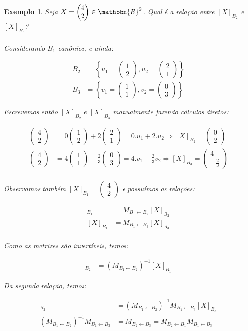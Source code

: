 \documentclass{article}
\newcommand{\REAL} {\mathbbm{R}}
\newcommand{\mudabase}[3] {#1_{#2 \leftarrow #3}}
\newcommand{\vetor}[2] {\begin{pmatrix}#1\\#2\end{pmatrix}} %
\newtheorem{example}{Exemplo}[section]
\begin{document}
        \begin{example}
            Seja $X = \vetor{4}{2} \in \REAL^2$. Qual é a relação entre $[X]_{B_2}$ e $[X]_{B_3}$?

            \paragraph{}
            Considerando $B_1$ canônica, e ainda:

            \begin{align*}
                B_2 &= \left\{ u_1 = \vetor{1}{2}, u_2 = \vetor{2}{1} \right\}\\
                B_3 &= \left\{ v_1 = \vetor{1}{1}, v_2 = \vetor{0}{3} \right\}
            \end{align*}

            Escrevemos então $[X]_{B_2}$ e $[X]_{B_3}$ manualmente fazendo cálculos diretos:

            \begin{align*}
                \vetor{4}{2} &= 0 \vetor{1}{2} + 2 \vetor{2}{1} = 0.u_1 + 2.u_2 \Rightarrow [X]_{B_2} = \vetor{0}{2}\\
                \vetor{4}{2} &= 4 \vetor{1}{1} - \frac{2}{3} \vetor{0}{3} = 4.v_1 - \frac{2}{3}v_2 \Rightarrow [X]_{B_3} = \vetor{4}{-\frac{2}{3}}\\
            \end{align*}

            Observamos também $[X]_{B_1} = \vetor{4}{2}$ e possuímos as relações:

            \begin{align*}
                [X]_{B_1} &= \mudabase{M}{B_1}{B_2} [X]_{B_2}\\
                [X]_{B_1} &= \mudabase{M}{B_1}{B_3} [X]_{B_3}\\
            \end{align*}

            Como as matrizes são invertíveis, temos:

            \begin{align*}
                [X]_{B_2} &= (\mudabase{M}{B_1}{B_2})^{-1} [X]_{B_1}
            \end{align*}

            Da segunda relação, temos:

            \begin{align*}
                [X]_{B_2} &= (\mudabase{M}{B_1}{B_2})^{-1} \mudabase{M}{B_1}{B_3} [X]_{B_3}\\
                (\mudabase{M}{B_1}{B_2})^{-1} \mudabase{M}{B_1}{B_3} &= \mudabase{M}{B_2}{B_3} = \mudabase{M}{B_2}{B_1}\mudabase{M}{B_1}{B_3}
            \end{align*}
        \end{example}
\end{document}
